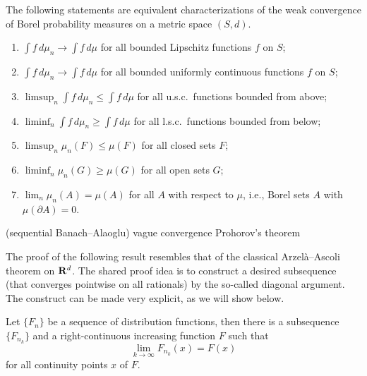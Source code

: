 \begin{namedthm}
The following statements are equivalent characterizations of the weak convergence of Borel probability measures on a metric space $(S,d)$.
    \begin{enumerate}
        \item $\int f\,d\mu_n \to \int f\,d\mu$ for all bounded Lipschitz functions $f$ on $S$;
        \item $\int f\,d\mu_n \to \int f\,d\mu$ for all bounded uniformly continuous functions $f$ on $S$;
        \item $\limsup_n \int f\,d\mu_n \leq \int f\,d\mu$ for all u.s.c.\ functions bounded from above;
        \item $\liminf_n \int f\,d\mu_n \geq \int f\,d\mu$ for all l.s.c.\ functions bounded from below;
        \item $\limsup_n \mu_n(F)\leq \mu(F)$ for all closed sets $F$;
        \item $\liminf_n \mu_n(G)\geq \mu(G)$ for all open sets $G$;
        \item $\lim_n \mu_n(A) = \mu(A)$ for all  $A$ with respect to $\mu$, i.e., Borel sets $A$ with $\mu(\partial A) = 0$.
    \end{enumerate}
\end{namedthm}



(sequential Banach--Alaoglu) vague convergence Prohorov’s theorem 

The proof of the following result resembles that of the classical Arzelà--Ascoli theorem on $\mathbf{R}^d$. The shared proof idea is to construct a desired subsequence (that converges pointwise on all rationals) by the so-called diagonal argument. %
The construct can be made very explicit, as we will show below.

\begin{lem} \label{lem:Helly-pre}
    Let $\{F_n\}$ be a sequence of distribution functions, then there is a subsequence $\{F_{n_k}\}$ and a right-continuous increasing function $F$ such that \[
        \lim_{k\to \infty} F_{n_k}(x) = F(x)
    \] for all continuity points $x$ of $F$.
\end{lem}


